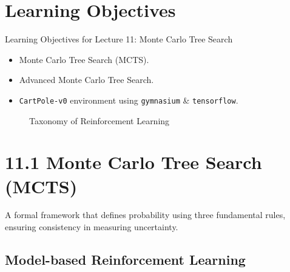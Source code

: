 \documentclass[
  letterpaper,
  DIV=11,
  numbers=noendperiod]{scrreprt}
\makeatletter
\providecommand{\tightlist}{%
  \setlength{\itemsep}{0pt}\setlength{\parskip}{0pt}}\usepackage{longtable,booktabs,array}
\newcommand*\pandocbounded[1]{%
  \sbox\pandoc@box{#1}%
  \Gscale@div\@tempa{\textheight}{\dimexpr\ht\pandoc@box+\dp\pandoc@box\relax}%
  \Gscale@div\@tempb{\linewidth}{\wd\pandoc@box}%
  \ifdim\@tempb\p@<\@tempa\p@\let\@tempa\@tempb\fi%
  \ifdim\@tempa\p@<\p@\scalebox{\@tempa}{\usebox\pandoc@box}%
  \else\usebox{\pandoc@box}%
  \fi%
}
\makeatother
\begin{document}
\chapter{Learning Objectives}\label{learning-objectives-9}

\begin{tcolorbox}[enhanced jigsaw, arc=.35mm, toprule=.15mm, leftrule=.75mm, colback=white, left=2mm, colframe=quarto-callout-note-color-frame, rightrule=.15mm, opacityback=0, breakable, bottomrule=.15mm]

Learning Objectives for Lecture 11: Monte Carlo Tree Search 🎯

\end{tcolorbox}

\begin{itemize}
\tightlist
\item
  Monte Carlo Tree Search (MCTS).
\item
  Advanced Monte Carlo Tree Search.
\item
  \texttt{CartPole-v0} environment using \texttt{gymnasium} \&
  \texttt{tensorflow}.
\end{itemize}

\begin{figure}[H]

{\centering \pandocbounded{}

}

\caption{Taxonomy of Reinforcement Learning}

\end{figure}%

\chapter{11.1 Monte Carlo Tree Search
(MCTS)}\label{monte-carlo-tree-search-mcts}

\begin{tcolorbox}[enhanced jigsaw, arc=.35mm, toprule=.15mm, leftrule=.75mm, colback=white, left=2mm, colframe=quarto-callout-note-color-frame, rightrule=.15mm, opacityback=0, breakable, bottomrule=.15mm]

A formal framework that defines probability using three fundamental
rules, ensuring consistency in measuring uncertainty. 🎲

\end{tcolorbox}

\section{Model-based Reinforcement
Learning}\label{model-based-reinforcement-learning}
\end{document}
